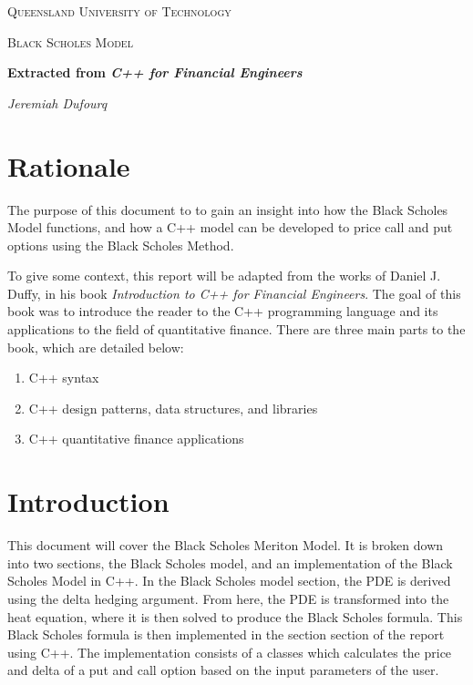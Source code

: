 \documentclass[12pt]{article}
\author{Jeremiah Dufourq}
\begin{document}
\begin{titlepage}
	\centering
	
	
	{\scshape\LARGE Queensland University of Technology \par}
	\vspace{5cm}
	{\scshape\Large Black Scholes Model\par}
	\vspace{1.5cm}
	{\huge\bfseries Extracted from \textit{C++ for Financial Engineers}\par}
	\vspace{2cm}
	{\Large\itshape Jeremiah Dufourq\par}
\end{titlepage}


\newpage
\tableofcontents
\newpage

\section{Rationale}
The purpose of this document to to gain an insight into how the Black Scholes Model functions, and how a C++ model can be developed to price call and put options using the Black Scholes Method. 

To give some context, this report will be adapted from the works of Daniel J. Duffy, in his book \textit{Introduction to C++ for Financial Engineers}. The goal of this book was to introduce the reader to the C++ programming language and its applications to the field of quantitative finance. There are three main parts to the book, which are detailed below:

\begin{enumerate}
	\item C++ syntax 
	\item C++ design patterns, data structures, and libraries
	\item C++ quantitative finance applications
\end{enumerate}

\section{Introduction}
This document will cover the Black Scholes Meriton Model. It is broken down into two sections, the Black Scholes model, and an implementation of the Black Scholes Model in C++. In the Black Scholes model section, the PDE is derived using the delta hedging argument. From here, the PDE is transformed into the heat equation, where it is then solved to produce the Black Scholes formula. This Black Scholes formula is then implemented in the section section of the report using C++. The implementation consists of a classes which calculates the price and delta of a put and call option based on the input parameters of the user. 
\end{document}
